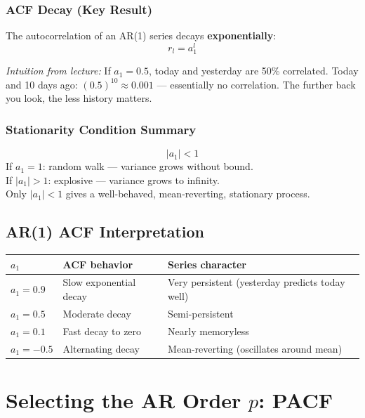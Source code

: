 \documentclass[11pt]{article}
\begin{document}
\subsubsection{ACF Decay (Key Result)}
The autocorrelation of an AR(1) series decays \textbf{exponentially}:
\[
r_l = a_1^l
\]

\textit{Intuition from lecture:} If $a_1 = 0.5$, today and yesterday are 50\%
correlated. Today and 10 days ago: $(0.5)^{10} \approx 0.001$ --- essentially
no correlation. The further back you look, the less history matters.

\subsubsection{Stationarity Condition Summary}
\[
|a_1| < 1
\]
If $a_1 = 1$: random walk --- variance grows without bound.\\
If $|a_1| > 1$: explosive --- variance grows to infinity.\\
Only $|a_1| < 1$ gives a well-behaved, mean-reverting, stationary process.

\subsection{AR(1) ACF Interpretation}

\begin{center}
\begin{tabular}{@{}lll@{}}
\toprule
\textbf{$a_1$} & \textbf{ACF behavior} & \textbf{Series character} \\
\midrule
$a_1 = 0.9$    & Slow exponential decay & Very persistent (yesterday predicts today well) \\
$a_1 = 0.5$    & Moderate decay          & Semi-persistent \\
$a_1 = 0.1$    & Fast decay to zero      & Nearly memoryless \\
$a_1 = -0.5$   & Alternating decay       & Mean-reverting (oscillates around mean) \\
\bottomrule
\end{tabular}
\end{center}


\section{Selecting the AR Order $p$: PACF}
\end{document}
